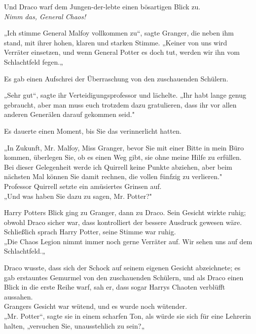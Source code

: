 {Und Draco warf dem Jungen-der-lebte einen bösartigen Blick zu.\\ \emph{Nimm das, General Chaos!}

„Ich stimme General Malfoy vollkommen zu“, sagte Granger, die neben ihm stand, mit ihrer hohen, klaren und starken Stimme. „Keiner von uns wird Verräter einsetzen, und wenn General Potter es doch tut, werden wir ihn vom Schlachtfeld fegen.„

Es gab einen Aufschrei der Überraschung von den zuschauenden Schülern.

„Sehr gut“, sagte ihr Verteidigungsprofessor und lächelte. „Ihr habt lange genug gebraucht, aber man muss euch trotzdem dazu gratulieren, dass ihr vor allen anderen Generälen darauf gekommen seid."

Es dauerte einen Moment, bis Sie das verinnerlicht hatten.

„In Zukunft, Mr. Malfoy, Miss Granger, bevor Sie mit einer Bitte in mein Büro kommen, überlegen Sie, ob es einen Weg gibt, sie ohne meine Hilfe zu erfüllen.\\ Bei dieser Gelegenheit werde ich Quirrell keine Punkte abziehen, aber beim nächsten Mal können Sie damit rechnen, die vollen fünfzig zu verlieren."\\ Professor Quirrell setzte ein amüsiertes Grinsen auf.\\ „Und was haben Sie dazu zu sagen, Mr. Potter?"

Harry Potters Blick ging zu Granger, dann zu Draco. Sein Gesicht wirkte ruhig; obwohl Draco sicher war, dass kontrolliert der bessere Ausdruck gewesen wäre.\\ Schließlich sprach Harry Potter, seine Stimme war ruhig.\\ „Die Chaos Legion nimmt immer noch gerne Verräter auf. Wir sehen uns auf dem Schlachtfeld.„

Draco wusste, dass sich der Schock auf seinem eigenen Gesicht abzeichnete; es gab erstauntes Gemurmel von den zuschauenden Schülern, und als Draco einen Blick in die erste Reihe warf, sah er, dass sogar Harrys Chaoten verblüfft aussahen.\\ Grangers Gesicht war wütend, und es wurde noch wütender.\\ „Mr. Potter“, sagte sie in einem scharfen Ton, als würde sie sich für eine Lehrerin halten, „versuchen Sie, unausstehlich zu sein?„

}
